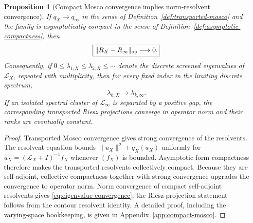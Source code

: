 \documentclass[11pt]{article}
\newtheorem{proposition}[theorem]{Proposition}
\theoremstyle{definition}
\theoremstyle{remark}
\newcommand{\norm}[1]{\lVert#1\rVert}
\begin{document}
\begin{proposition}[Compact Mosco convergence implies norm-resolvent convergence]
\label{prop:compact-mosco-resolvent}
If $q_X\to q_\infty$ in the sense of
Definition~\ref{def:transported-mosco} and the family is asymptotically
compact in the sense of Definition~\ref{def:asymptotic-compactness}, then
\begin{equation}
\boxed{\norm{R_X-R_\infty}_{\rm op}\longrightarrow0.}
\label{eq:norm-resolvent}
\end{equation}
Consequently, if
$0\le\lambda_{1,X}\le\lambda_{2,X}\le\cdots$ denote the discrete screened
eigenvalues of $\mathscr L_X$, repeated with multiplicity, then for every
fixed index in the limiting discrete spectrum,
\begin{equation}
\boxed{\lambda_{k,X}\longrightarrow\lambda_{k,\infty}.}
\label{eq:eigenvalue-convergence}
\end{equation}
If an isolated spectral cluster of $\mathscr L_\infty$ is separated by a
positive gap, the corresponding transported Riesz projections converge in
operator norm and their ranks are eventually constant.
\end{proposition}

\begin{proof}
Transported Mosco convergence gives strong convergence of the resolvents.
The resolvent equation bounds
$\norm{u_X}^2+q_X(u_X)$ uniformly for
$u_X=(\mathscr L_X+I)^{-1}f_X$ whenever $(f_X)$ is bounded.  Asymptotic form
compactness therefore makes the transported resolvents collectively compact.
Because they are self-adjoint, collective compactness together with strong
convergence upgrades the convergence to operator norm.  Norm convergence of
compact self-adjoint resolvents gives \eqref{eq:eigenvalue-convergence}; the
Riesz-projection statement follows from the contour resolvent identity.
A detailed proof, including the varying-space bookkeeping, is given in
Appendix~\ref{app:compact-mosco}.
\end{proof}
\end{document}
